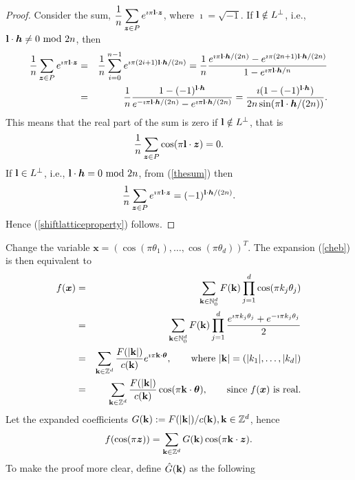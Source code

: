 \documentclass[article]{siamltex}
\def\bx{\boldsymbol x}
\def\bz{{\boldsymbol z}}
\def\bk{{\bf k}}
\def\bh{{\boldsymbol h}}
\def\bl{{\bf l}}
\def\bthe{{\boldsymbol \theta }}
\newcommand{\Z}{{\mathbb Z}}
\newcommand{\N}{\mathbb{N}}
\newcommand{\dprod}{\displaystyle\prod}
\newcommand{\dsum}{\displaystyle\sum}
\begin{document}
\begin{proof} Consider the sum, ${\displaystyle \frac{1}{n}
\dsum_{\bz\in P} e^{\imath \pi \bl\cdot \bz}}$, where
$\imath=\sqrt{-1}$. If $\bl\notin L^{\bot}$, i.e., $\bl\cdot
\bh\neq 0\ \hbox{mod}\ 2n$, then
\begin{eqnarray}\label{thesum}
\frac{1}{n} \dsum_{\bz\in P} e^{\imath \pi \bl\cdot \bz}
 &=& \frac{1}{n} \dsum_{i=0}^{n-1} e^{\imath \pi (2i+1)\bl
\cdot \bh/(2n)}= \frac{1}{n} \frac{e^{\imath \pi \bl \cdot
\bh/(2n)} - e^{\imath \pi (2n+1)\bl \cdot \bh/(2n)}}{1- e^{\imath
\pi \bl \cdot
\bh/n}}\nonumber\\
&=& \frac{1}{n} \frac{1- (-1)^{\bl\cdot \bh}} {e^{-\imath \pi \bl
\cdot \bh/(2n)}- e^{\imath \pi \bl \cdot \bh/(2n)}}
 =
\frac{\imath(1-(-1)^{\bl\cdot\bh})}
{2n\sin(\pi\bl\cdot\bh/(2n))}.
\end{eqnarray}
This means that the real part of the sum is zero if $\bl\notin
L^{\bot}$, that is
\begin{equation}
\frac{1}{n} \dsum_{\bz\in P} \cos({\pi \bl\cdot \bz})
 =0.
\end{equation}
If $\bl\in L^{\bot}$, i.e., $\bl\cdot \bh = 0\ \hbox{mod}\ 2n$,
from (\ref{thesum}) then
\begin{equation}
\frac{1}{n} \dsum_{\bz\in P} e^{\imath \pi \bl\cdot \bz}
 =(-1)^{\bl\cdot \bh/(2n)}.
\end{equation}
Hence (\ref{shiftlatticeproperty}) follows.   \end{proof}

\vskip5mm

 Change the variable $\bx=(\cos(\pi \theta_1), \ldots, \cos(\pi
\theta_d))^T$. The expansion (\ref{cheb}) is then equivalent to
\begin{eqnarray}
 f(\bx)&=& \dsum_{\bk\in {\N}^d_{0}} F(\bk) \dprod_{j=1}^{d} \cos(\pi
 k_j\theta_j)\nonumber\\
  &=& \dsum_{\bk\in {\N}^d_{0}} F(\bk) \dprod_{j=1}^{d}
  \frac{e^{\imath \pi k_j\theta_j}
  + e^{-\imath \pi k_j \theta_j}}{2}\nonumber\\
  &=& \dsum_{\bk\in {\Z}^d} \frac{F(|\bk|)}{c(\bk)} e^{\imath \pi
  \bk\cdot \bthe},\qquad\hbox{where}\
  |\bk|=(|k_1|,\ldots,|k_d|)\nonumber\\
  &=& \dsum_{\bk\in {\Z}^d} \frac{F(|\bk|)}{c(\bk)} \cos(\pi
  \bk\cdot \bthe),\qquad\hbox{since}\ f(\bx)\ \hbox{is
  real}.
\end{eqnarray}
Let the expanded coefficients $G(\bk):=F(|\bk|)/c(\bk), \bk \in {\Z}^d$, hence
\begin{equation}\label{fcospiz}
 f(\cos(\pi \bz))=\dsum_{\bk\in {\Z}^d}
 G(\bk)\cos(\pi \bk \cdot \bz).
\end{equation}
To make the proof more clear,  define $\hat{G}(\bk)$ as the
following
\end{document}
